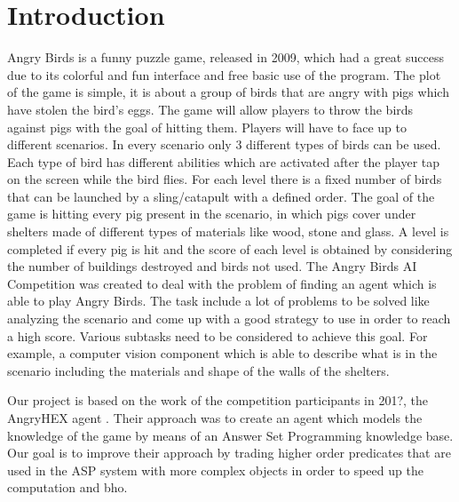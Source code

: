 \section{Introduction}
\label{intro}
Angry Birds is a funny puzzle game, released in 2009, which had a great success due to its colorful and fun interface and free basic use of
the program. The plot of the game is simple, it is about a group of birds that are angry with pigs which have stolen the bird's eggs. The game will allow players to throw the birds against pigs with the goal of hitting them. Players will have to face up to different scenarios. In every scenario only 3 different types of birds can be used. Each type of bird has different abilities which are activated after the player tap on the screen while the bird flies. For each level there is a fixed number of birds that can be launched by a sling/catapult with a defined order. The goal of the game is hitting every pig present in the scenario, in which pigs cover under shelters made of different types of materials like wood, stone and glass. A level is completed if every pig is hit and the score of each level is obtained by considering the number of buildings destroyed and birds not used.
The Angry Birds AI Competition was created to deal with the problem of finding an agent which is able to play Angry Birds. The task include a lot of problems to be solved like analyzing the scenario and come up with a good strategy to use in order to reach a high score. Various subtasks need to be considered to achieve this goal. For example, a computer vision component which is able to describe what is in the scenario including the materials and shape of the walls of the shelters.

Our project is based on the work of the competition participants in 201?, the AngryHEX agent \cite{}. Their approach was to create an agent which models the knowledge of the game by means of an Answer Set Programming knowledge base.
Our goal is to improve their approach by trading higher order predicates that are used in the ASP system with more complex objects in order to speed up the computation and bho.
